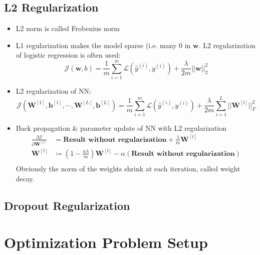 \subsection{L2 Regularization}
\begin{itemize}
  \item L2 norm is called Frobenius norm
  \item L1 regularization makes the model sparse (i.e. many 0 in $\mathbf{w}$. L2 regularization of logistic regression is often used:
  \[\mathcal{J}(\mathbf{w},b)=\frac{1}{m}\displaystyle\sum_{i=1}^m\mathcal{L}(\hat{y}^{(i)}, y^{(i)})+\frac{\lambda}{2m}\vert\vert\mathbf{w}\vert\vert^2_2\] 
  \item L2 regularization of NN: 
  \[\mathcal{J}(\mathbf{W}^{[1]},\mathbf{b}^{[1]},\cdots,\mathbf{W}^{[L]},\mathbf{b}^{[L]})=\frac{1}{m}\displaystyle\sum_{i=1}^m\mathcal{L}(\hat{y}^{(i)}, y^{(i)})+\frac{\lambda}{2m}\displaystyle\sum_{i=1}^L\vert\vert\mathbf{W}^{[l]}\vert\vert^2_F\] 
  \item Back propagation \& parameter update of NN with L2 regularization
  \begin{align*}
  \frac{\partial \mathcal{J}}{\partial \mathbf{W}^{[l]}}&=\textbf{Result without regularization}+\frac{\lambda}{m}\mathbf{W}^{[l]}\\
  \mathbf{W}^{[l]}&\coloneqq\left(1-\frac{\alpha\lambda}{m}\right)\mathbf{W}^{[l]}-\alpha(\textbf{Result without regularization})\\
  \end{align*}
  Obviously the norm of the weights shrink at each iteration, called weight decay. 
\end{itemize}
\subsection{Dropout Regularization}
\section{Optimization Problem Setup}
\ifx\PREAMBLE\undefined

\fi